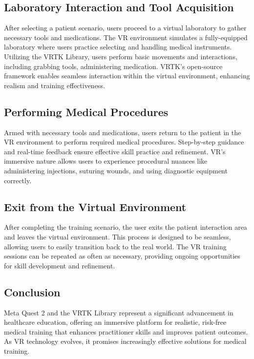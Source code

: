 \subsection{Laboratory Interaction and Tool Acquisition}
After selecting a patient scenario, users proceed to a virtual laboratory to gather necessary tools and medications. The VR environment simulates a fully-equipped laboratory where users practice selecting and handling medical instruments. Utilizing the VRTK Library, users perform basic movements and interactions, including grabbing tools, administering medication. VRTK's open-source framework enables seamless interaction within the virtual environment, enhancing realism and training effectiveness.
\subsection{Performing Medical Procedures}
Armed with necessary tools and medications, users return to the patient in the VR environment to perform required medical procedures. Step-by-step guidance and real-time feedback ensure effective skill practice and refinement. VR's immersive nature allows users to experience procedural nuances like administering injections, suturing wounds, and using diagnostic equipment correctly.
\subsection{Exit from the Virtual Environment}
After completing the training scenario, the user exits the patient interaction area and leaves the virtual environment. This process is designed to be seamless, allowing users to easily transition back to the real world. The VR training sessions can be repeated as often as necessary, providing ongoing opportunities for skill development and refinement.

\subsection{Conclusion}
Meta Quest 2 and the VRTK Library represent a significant advancement in healthcare education, offering an immersive platform for realistic, risk-free medical training that enhances practitioner skills and improves patient outcomes. As VR technology evolves, it promises increasingly effective solutions for medical training.
